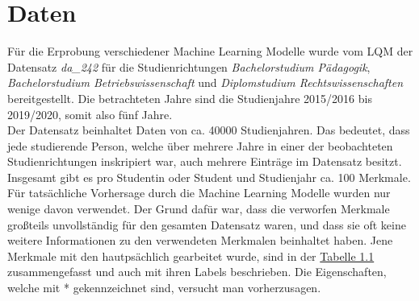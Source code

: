 

\section{Daten}
\label{sec:daten}

F\"ur die Erprobung verschiedener Machine Learning Modelle wurde vom LQM der Datensatz 
\textit{da\_242} f\"ur die Studienrichtungen \textit{Bachelorstudium P\"adagogik}, 
\textit{Bachelorstudium Betriebswissenschaft} und \textit{Diplomstudium Rechtswissenschaften} bereitgestellt.
Die betrachteten Jahre sind die Studienjahre 2015/2016 bis 2019/2020, somit also f\"unf Jahre. \\

Der Datensatz beinhaltet Daten von ca. 40000 Studienjahren. Das bedeutet, dass jede studierende Person,
welche \"uber mehrere Jahre in einer der beobachteten Studienrichtungen inskripiert war, auch mehrere Eintr\"age im Datensatz besitzt. \\

Insgesamt gibt es pro Studentin oder Student und Studienjahr ca. 100 Merkmale. 
F\"ur tats\"achliche Vorhersage durch die Machine Learning Modelle wurden nur wenige davon verwendet. 
Der Grund daf\"ur war, dass die verworfen Merkmale gro{\ss}teils unvollst\"andig f\"ur den gesamten Datensatz waren, 
und dass sie oft keine weitere Informationen zu den verwendeten Merkmalen beinhaltet haben. Jene Merkmale mit den hautps\"achlich 
gearbeitet wurde, sind in der \hyperref[tab:name]{Tabelle 1.1} zusammengefasst und auch mit ihren Labels beschrieben. Die Eigenschaften, welche mit 
*  gekennzeichnet sind, versucht man vorherzusagen. 

